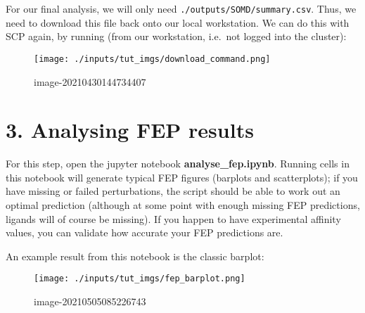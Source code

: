 For our final analysis, we will only need
\texttt{./outputs/SOMD/summary.csv}. Thus, we need to download this file
back onto our local workstation. We can do this with SCP again, by
running (from our workstation, i.e.~not logged into the cluster):

\begin{figure}
\centering
\texttt{[image: ./inputs/tut\_imgs/download\_command.png]}
\caption{image-20210430144734407}
\end{figure}

\hypertarget{analysing-fep-results}{%
\section{3. Analysing FEP results}\label{analysing-fep-results}}

For this step, open the jupyter notebook \textbf{analyse\_fep.ipynb}.
Running cells in this notebook will generate typical FEP figures
(barplots and scatterplots); if you have missing or failed
perturbations, the script should be able to work out an optimal
prediction (although at some point with enough missing FEP predictions,
ligands will of course be missing). If you happen to have experimental
affinity values, you can validate how accurate your FEP predictions are.

An example result from this notebook is the classic barplot:

\begin{figure}
\centering
\texttt{[image: ./inputs/tut\_imgs/fep\_barplot.png]}
\caption{image-20210505085226743}
\end{figure}
